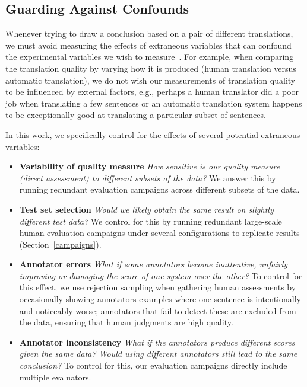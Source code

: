\documentclass[a4paper]{article}
\begin{document}
\begin{CJK*}{UTF8}{gbsn}
\subsection{Guarding Against Confounds}
\label{confounds}

Whenever trying to draw a conclusion based on a pair of different translations, we must avoid measuring the effects of extraneous variables that can confound the experimental variables we wish to measure~\cite{clark2011better}. For example, when comparing the translation quality by varying how it is produced (human translation versus automatic translation), we do not wish our measurements of translation quality to be influenced by external factors, e.g., perhaps a human translator did a poor job when translating a few sentences or an automatic translation system happens to be exceptionally good at translating a particular subset of sentences.

\bigskip \noindent In this work, we specifically control for the effects of several potential extraneous variables:
\begin{itemize}

\item \textbf{Variability of quality measure} \emph{How sensitive is our quality measure (direct assessment) to different subsets of the data?} We answer this by running redundant evaluation campaigns across different subsets of the data.

\item \textbf{Test set selection} \emph{Would we likely obtain the same result on slightly different test data?} We control for this by running redundant large-scale human evaluation campaigns under several configurations to replicate results (Section~\ref{campaigns}).

\item \textbf{Annotator errors} \emph{What if some annotators become inattentive, unfairly improving or damaging the score of one system over the other?} To control for this effect, we use rejection sampling when gathering human assessments by occasionally showing annotators examples where one sentence is intentionally and noticeably worse; annotators that fail to detect these are excluded from the data, ensuring that human judgments are high quality.

\item \textbf{Annotator inconsistency} \emph{What if the annotators produce different scores given the same data? Would using different annotators still lead to the same conclusion?} To control for this, our evaluation campaigns directly include multiple evaluators.


\end{itemize}
\end{CJK*}
\end{document}
